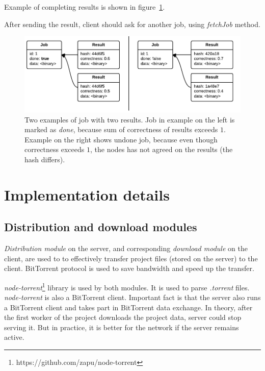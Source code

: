 Example of completing results is shown in figure~\ref{f:sendresultsex}.

After sending the result, client should ask for another job, using \emph{fetchJob} method.

\begin{figure}
\centering
\includegraphics{diagrams/SendResultsExample.pdf}
\caption{Two examples of job with two results. Job in example on the left is marked as \emph{done}, because sum of correctness of results exceeds $1$. Example on the right shows undone job, because even though correctness exceeds $1$, the nodes has not agreed on the results (the hash differs).}
\label{f:sendresultsex}
\end{figure}

\section{Implementation details}
\label{s:impldet}

\subsection{Distribution and download modules}
\label{s:torrent_dist}

\emph{Distribution module} on the server, and corresponding \emph{download module} on the client, are used to to effectively transfer project files (stored on the server) to the client. BitTorrent protocol is used to save bandwidth and speed up the transfer.

\emph{node-torrent}\footnote{https://github.com/zapu/node-torrent} library is used by both modules. It is used to parse \emph{.torrent} files. \emph{node-torrent} is also a BitTorrent client. Important fact is that the server also runs a BitTorrent client and takes part in BitTorrent data exchange. In theory, after the first worker of the project downloads the project data, server could stop serving it. But in practice, it is better for the network if the server remains active.

